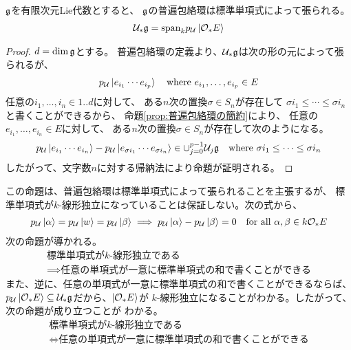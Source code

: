 {	\begin{proposition}[PBWの定理その一]\label{prop:PBWの定理その一} %
		${\mathfrak{g}}$を有限次元Lie代数とすると、
		${\mathfrak{g}}$の普遍包絡環は標準単項式によって張られる。
		\begin{equation*}\begin{split}
			{\ensuremath{{\mathcal{U}}}}_*{\mathfrak{g}} = {\operatorname{span}}_kp_{{\mathcal{U}}}\mathinner{|{{\ensuremath{{\mathcal{O}}}}_*E}\rangle}
		\end{split}\end{equation*}
	\end{proposition} %
	\begin{proof} $d=\dim{\mathfrak{g}}$とする。
	普遍包絡環の定義より、${{\mathcal{U}}}_*{\mathfrak{g}}$は次の形の元によって張られるが、
	\begin{equation*}\begin{split}
		p_{{\mathcal{U}}}\mathinner{|{e_{i_1}\cdots e_{i_p}}\rangle} \quad\text{where }
			e_{i_1},\dots,e_{i_p}\in E
	\end{split}\end{equation*}
	任意の$i_1,\dots,i_n\in 1..d$に対して、
	ある$n$次の置換$\sigma\in S_n$が存在して
	$\sigma i_1\le \cdots \le \sigma i_n$と書くことができるから、
	命題\ref{prop:普遍包絡環の簡約}により、
	任意の$e_{i_1},\dots,e_{i_n}\in E$に対して、
	ある$n$次の置換$\sigma\in S_n$が存在して次のようになる。
	\begin{equation*}\begin{split}
		p_{{\mathcal{U}}}\mathinner{|{e_{i_1}\cdots e_{i_n}}\rangle} 
		- p_{{\mathcal{U}}}\mathinner{|{e_{\sigma i_1}\cdots e_{\sigma i_n}}\rangle}
		\in \cup_{j=0}^{p-1}{{\mathcal{U}}}_j{\mathfrak{g}}
		\quad\text{where } \sigma i_1\le \cdots \le \sigma i_n
	\end{split}\end{equation*}
	したがって、文字数$n$に対する帰納法により命題が証明される。
	\end{proof}

	この命題は、普遍包絡環は標準単項式によって張られることを主張するが、
	標準単項式が$k$-線形独立になっていることは保証しない。次の式から、
	\begin{equation*}\begin{split}
		p_{{\mathcal{U}}}\mathinner{|{\alpha}\rangle} = p_{{\mathcal{U}}}\mathinner{|{w}\rangle} = p_{{\mathcal{U}}}\mathinner{|{\beta}\rangle}
		\implies p_{{\mathcal{U}}}\mathinner{|{\alpha}\rangle} - p_{{\mathcal{U}}}\mathinner{|{\beta}\rangle} = 0
		\quad\text{for all } \alpha,\beta\in k{{\mathcal{O}}}_*E
	\end{split}\end{equation*}
	次の命題が導かれる。
	\begin{equation*}\begin{array}{l}
		\text{標準単項式が$k$-線形独立である} \\
		\implies \text{任意の単項式が一意に標準単項式の和で書くことができる}
	\end{array}\end{equation*}
	また、逆に、任意の単項式が一意に標準単項式の和で書くことができるならば、
	$p_{{\mathcal{U}}}\mathinner{|{{\ensuremath{{\mathcal{O}}}}_*E}\rangle}\subseteq{\ensuremath{{\mathcal{U}}}}_*{\mathfrak{g}}$だから、$\mathinner{|{{\ensuremath{{\mathcal{O}}}}_*E}\rangle}$が
	$k$-線形独立になることがわかる。したがって、次の命題が成り立つことが
	わかる。
	\begin{equation*}\begin{array}{l}
		\text{標準単項式が$k$-線形独立である} \\
		\iff \text{任意の単項式が一意に標準単項式の和で書くことができる}
	\end{array}\end{equation*}

}
